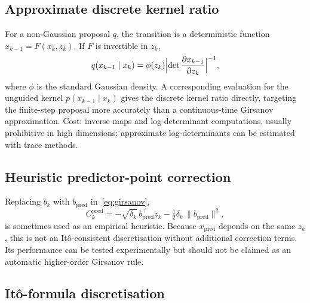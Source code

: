 \documentclass[11pt]{article}
\begin{document}
\subsection{Approximate discrete kernel ratio}

For a non-Gaussian proposal $q$, the transition is a deterministic function
$x_{k-1} = F(x_k, z_k)$.
If $F$ is invertible in $z_k$,
\[
q(x_{k-1}\mid x_k)
=
\phi(z_k)
\Bigl|\det\frac{\partial x_{k-1}}{\partial z_k}\Bigr|^{-1},
\]
where $\phi$ is the standard Gaussian density.
A corresponding evaluation for the unguided kernel $p(x_{k-1}\mid x_k)$ gives
the discrete kernel ratio directly, targeting the finite-step proposal more
accurately than a continuous-time Girsanov approximation.
Cost: inverse maps and log-determinant computations, usually prohibitive in
high dimensions; approximate log-determinants can be estimated with trace methods.

\subsection{Heuristic predictor-point correction}

Replacing $b_k$ with $b_{\text{pred}}$ in~\eqref{eq:girsanov},
\[
C_k^{\text{pred}}
=
-\sqrt{\delta_k}\,b_{\text{pred}}^\top z_k
-\tfrac12\delta_k\,\|b_{\text{pred}}\|^2,
\]
is sometimes used as an empirical heuristic.
Because $x_{\text{pred}}$ depends on the same $z_k$, this is not an
It\^o-consistent discretisation without additional correction terms.
Its performance can be tested experimentally but should not be claimed as an
automatic higher-order Girsanov rule.

\subsection{It\^o-formula discretisation}
\label{app:ito-vtau}
\end{document}

